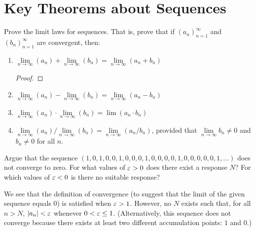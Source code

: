 \section{Key Theorems about Sequences}

\begin{problem}
Prove the limit laws for sequences. That is, prove that if
$(a_{n})_{n=1}^{\infty}$ and $(b_{n})_{n=1}^{\infty}$ are convergent, then:

  \begin{enumerate}[label=(\alph*)]
    \item $\lim\limits_{n \to \infty} {(a_{n})} + \lim\limits_{n \to \infty} {(b_{n})} = \lim\limits_{n \to \infty} {(a_{n} + b_{n})}$

      \begin{proof}

      \end{proof}

    \item $\lim\limits_{n \to \infty} {(a_{n})} - \lim\limits_{n \to \infty} {(b_{n})} = \lim\limits_{n \to \infty} {(a_{n} - b_{n})}$
    \item $\lim\limits_{n \to \infty} {(a_{n})} \cdot \lim\limits_{n \to \infty} {(b_{n})} = \lim {(a_{n} \cdot b_{n})}$
    \item $\lim\limits_{n \to \infty} {(a_{n})} / \lim\limits_{n \to \infty} {(b_{n})} = \lim\limits_{n \to \infty} {(a_{n} / b_{n})}$, provided that $\lim\limits_{n \to \infty} {b_{n}} \neq 0$
      and $b_{n} \neq 0$ for all $n$.
  \end{enumerate}
\end{problem}

\begin{problem}
  Argue that the sequence $(1, 0, 1, 0, 0, 1, 0, 0, 0, 1, 0, 0, 0, 0, 1, 0, 0, 0, 0, 0, 1, \ldots)$ does not converge to zero. For what values of $\varepsilon > 0$
  does there exist a response $N$? For which values of $\varepsilon < 0$ is there no
  suitable response? 

  \vspace{\baselineskip}

    We see that the definition of convergence (to suggest that the limit of the
    given sequence equals $0$) is satisfied when $\varepsilon > 1$. However, no $N$
    exists such that, for all $n > N$, $\left\lvert a_{n} \right\rvert < \varepsilon$ whenever $0 < \varepsilon \leq 1$. 
    (Alternatively, this sequence does not converge because there exists at least
    two different accumulation points: $1$ and $0$.)
\end{problem}

